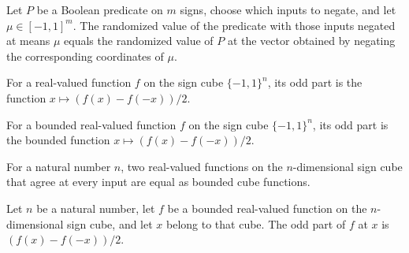 \begin{theorem}
\label{FABL.SignPredicate.randomizedValue_negateInputs}
\leanok
{}
Let $P$ be a Boolean predicate on $m$ signs, choose which inputs to negate, and let
$\mu\in[-1,1]^m$. The randomized value of the predicate with those inputs negated at
means $\mu$ equals the randomized value of $P$ at the vector obtained by negating the
corresponding coordinates of $\mu$.
\end{theorem}

\begin{definition}
\label{FABL.oddPart}
\leanok
For a real-valued function $f$ on the sign cube $\{-1,1\}^n$, its odd part is the
function $x\mapsto (f(x)-f(-x))/2$.
\end{definition}

\begin{definition}
\label{FABL.BoundedCubeFunction.oddPart}
\leanok
{}
For a bounded real-valued function $f$ on the sign cube $\{-1,1\}^n$, its odd part is
the bounded function $x\mapsto (f(x)-f(-x))/2$.
\end{definition}

\begin{theorem}
\label{FABL.BoundedCubeFunction.ext}
\leanok
{}
For a natural number $n$, two real-valued functions on the $n$-dimensional sign cube
that agree at every input are equal as bounded cube functions.
\end{theorem}

\begin{theorem}
\label{FABL.BoundedCubeFunction.oddPart_apply}
\leanok
{}
Let $n$ be a natural number, let $f$ be a bounded real-valued function on the
$n$-dimensional sign cube, and let $x$ belong to that cube. The odd part of $f$ at $x$
is $(f(x)-f(-x))/2$.
\end{theorem}


